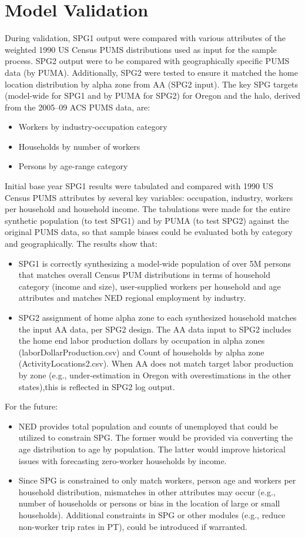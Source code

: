 \section{Model Validation}
During validation, SPG1 output were compared with various attributes of the weighted 1990 US Census PUMS distributions used as input for the sample process. SPG2 output were to be compared with geographically specific PUMS data (by PUMA). Additionally, SPG2 were tested to ensure it matched the home location distribution by alpha zone from AA (SPG2 input). The key SPG targets (model-wide for SPG1 and by PUMA for SPG2) for Oregon and the halo, derived from the 2005--09 ACS PUMS data, are:
\begin{itemize}
\item Workers by industry-occupation category
\item Households by number of workers
\item Persons by age-range category
\end{itemize}

Initial base year SPG1 results were tabulated and compared with 1990 US Census PUMS attributes by several key variables: occupation, industry, workers per household and household income. The tabulations were made for the entire synthetic population (to test SPG1) and by PUMA (to test SPG2) against the original PUMS data, so that sample biases could be evaluated both by category and geographically. The results show that:
\begin{itemize}
\item SPG1 is correctly synthesizing a model-wide population of over 5M persons that matches overall Census PUM distributions in terms of household category (income and size), user-supplied workers per household and age attributes and matches NED regional employment by industry.
\item SPG2 assignment of home alpha zone to each synthesized household matches the input AA data, per SPG2 design. The AA data input to SPG2 includes the home end labor production dollars by occupation in alpha zones (laborDollarProduction.csv) and Count of households by alpha zone (ActivityLocations2.csv). When AA does not match target labor production by zone (e.g., under-estimation in Oregon with overestimations in the other states),this is reflected in SPG2 log output.
\end{itemize}

\noindent For the future:
\begin{itemize}
\item NED provides total population and counts of unemployed that could be utilized to constrain SPG.  The former would be provided via converting the age distribution to age by population.  The latter would improve historical issues with forecasting zero-worker households by income.
\item Since SPG is constrained to only match workers, person age and workers per household distribution, mismatches in other attributes may occur (e.g., number of households or persons or bias in the location of large or small households). Additional constraints in SPG or other modules (e.g., reduce non-worker trip rates in PT), could be introduced if warranted.
\end{itemize}

